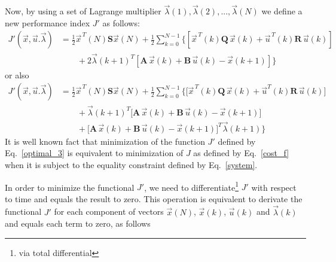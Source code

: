 \documentclass[11pt,a4paper,oneside]{book}
\numberwithin{equation}{section}
\theoremstyle{it}
\theoremstyle{definition}
\begin{document}
Now, by using a set of Lagrange multiplier 
$\vec{\lambda}(1),\vec{\lambda}(2),...,\vec{\lambda}(N)$ we define a new 
performance index $J'$ as follows:
\begin{equation}\label{optimal_3bis}
	\begin{aligned}
		J'(\vec{x},\vec{u}.\vec{\lambda}) &= 
		\frac{1}{2}\vec{x}^{\,T}(N)\mathbf{S}\vec{x}(N)+\frac{1}{2}\sum_{k=0}^{N-1}
		\Big\{ \left[ \vec{x}^{\,T}(k)\mathbf{Q}\,\vec{x}(k) + 
		\vec{u}^{\,T}(k)\mathbf{R}\,\vec{u}(k)\right]   \\[6pt]
		&\quad \quad + 2\vec{\lambda}(k+1)^T\left[ 
		\mathbf{A}\,\vec{x}(k)+\mathbf{B}\,\vec{u}(k) -\vec{x}(k+1) \right] \Big\}
	\end{aligned}
\end{equation}
or also
\begin{equation}\label{optimal_3}
	\begin{aligned}
		J'(\vec{x},\vec{u}.\vec{\lambda}) &= 
		\frac{1}{2}\vec{x}^{\,T}(N)\mathbf{S}\vec{x}(N)+\frac{1}{2}\sum_{k=0}^{N-1}
		\Bigg\{ \Big[ \vec{x}^{\,T}(k)\mathbf{Q}\,\vec{x}(k) + 
		\vec{u}^T(k)\mathbf{R}\,\vec{u}(k)\Big]   \\[6pt]
		&\quad \quad + \vec{\lambda}(k+1)^T\Big[ 
		\mathbf{A}\,\vec{x}(k)+\mathbf{B}\,\vec{u}(k) -\vec{x}(k+1) \Big] \\[6pt] 
		&\quad \quad +\Big[ \mathbf{A}\,\vec{x}(k)+\mathbf{B}\,\vec{u}(k) 
		-\vec{x}(k+1) \Big]^T \vec{\lambda}(k+1) \Bigg\}
	\end{aligned}
\end{equation}
It is well known fact that minimization of the function $J'$ defined by 
Eq.~\eqref{optimal_3} is equivalent to minimization of $J$ as defined by 
Eq.~\eqref{cost_f} when it is subject to the equality constraint defined by 
Eq.~\eqref{system}.

In order to minimize the functional $J'$, we need to differentiate\footnote{via total differential} $J'$ with 
respect to time and equals the result to zero. This operation is equivalent to derivate the functional $J'$ for each component of vectors $\vec{x}(N)$, $\vec{x}(k)$, $\vec{u}(k)$ 
and $\vec{\lambda}(k)$ and equals each term to zero, as follows
\end{document}
